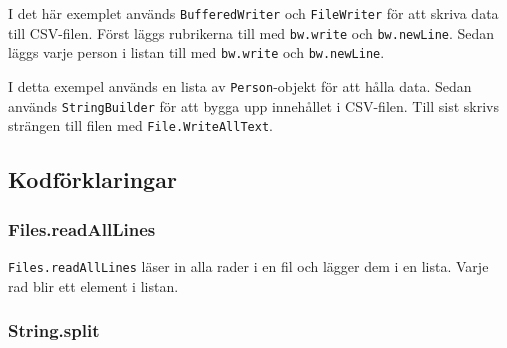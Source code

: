 \begin{Shaded}
\begin{Highlighting}[]
      \OperatorTok{()} \OperatorTok{\{}
        \OperatorTok{;}
    \OperatorTok{\}}

      \OperatorTok{()} \OperatorTok{\{}
        \OperatorTok{;}
    \OperatorTok{\}}

      \OperatorTok{()} \OperatorTok{\{}
        \OperatorTok{;}
    \OperatorTok{\}}

      \OperatorTok{()} \OperatorTok{\{}
        \OperatorTok{;}
    \OperatorTok{\}}
\OperatorTok{\}}
\end{Highlighting}
\end{Shaded}

I det här exemplet används \texttt{BufferedWriter} och
\texttt{FileWriter} för att skriva data till CSV-filen. Först läggs
rubrikerna till med \texttt{bw.write} och \texttt{bw.newLine}. Sedan
läggs varje person i listan till med \texttt{bw.write} och
\texttt{bw.newLine}.

I detta exempel används en lista av \texttt{Person}-objekt för att hålla
data. Sedan används \texttt{StringBuilder} för att bygga upp innehållet
i CSV-filen. Till sist skrivs strängen till filen med
\texttt{File.WriteAllText}.

\hypertarget{kodfuxf6rklaringar}{%
\subsection{Kodförklaringar}\label{kodfuxf6rklaringar}}

\hypertarget{files.readalllines}{%
\subsubsection{Files.readAllLines}\label{files.readalllines}}

\texttt{Files.readAllLines} läser in alla rader i en fil och lägger dem
i en lista. Varje rad blir ett element i listan.

\hypertarget{string.split}{%
\subsubsection{String.split}\label{string.split}}

